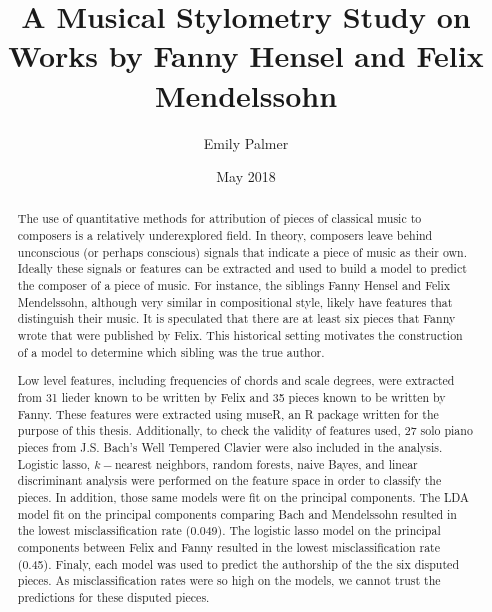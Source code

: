 \documentclass[12pt,twoside]{reedthesis}
\title{A Musical Stylometry Study on Works by Fanny Hensel and Felix
Mendelssohn}
\author{Emily Palmer}
\date{May 2018}
\theoremstyle{definition}
\theoremstyle{definition}
\theoremstyle{definition}
\theoremstyle{remark}
\begin{document}
  \maketitle

\frontmatter %
\pagestyle{empty} %



  \hypersetup{linkcolor=black}
  \setcounter{tocdepth}{2}
  \tableofcontents

  \listoftables

  \listoffigures
  \begin{abstract}
    The use of quantitative methods for attribution of pieces of classical
    music to composers is a relatively underexplored field. In theory,
    composers leave behind unconscious (or perhaps conscious) signals that
    indicate a piece of music as their own. Ideally these signals or
    features can be extracted and used to build a model to predict the
    composer of a piece of music. For instance, the siblings Fanny Hensel
    and Felix Mendelssohn, although very similar in compositional style,
    likely have features that distinguish their music. It is speculated that
    there are at least six pieces that Fanny wrote that were published by
    Felix. This historical setting motivates the construction of a model to
    determine which sibling was the true author.
    
    Low level features, including frequencies of chords and scale degrees,
    were extracted from 31 lieder known to be written by Felix and 35 pieces
    known to be written by Fanny. These features were extracted using museR,
    an R package written for the purpose of this thesis. Additionally, to
    check the validity of features used, 27 solo piano pieces from J.S.
    Bach's Well Tempered Clavier were also included in the analysis.
    Logistic lasso, \(k-\)nearest neighbors, random forests, naive Bayes,
    and linear discriminant analysis were performed on the feature space in
    order to classify the pieces. In addition, those same models were fit on
    the principal components. The LDA model fit on the principal components
    comparing Bach and Mendelssohn resulted in the lowest misclassification
    rate (0.049). The logistic lasso model on the principal components
    between Felix and Fanny resulted in the lowest misclassification rate
    (0.45). Finaly, each model was used to predict the authorship of the the
    six disputed pieces. As misclassification rates were so high on the
    models, we cannot trust the predictions for these disputed pieces.
  \end{abstract}
\end{document}
